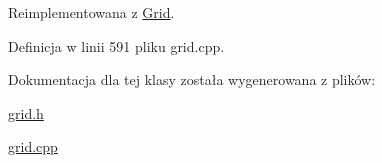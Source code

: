 Reimplementowana z \hyperlink{class_grid_ac0cf78c28206fd44fba21c5a91d0a0e0}{Grid}.



Definicja w linii 591 pliku grid.\+cpp.



Dokumentacja dla tej klasy została wygenerowana z plików\+:\begin{DoxyCompactItemize}
\item 
\hyperlink{grid_8h}{grid.\+h}\item 
\hyperlink{grid_8cpp}{grid.\+cpp}\end{DoxyCompactItemize}
